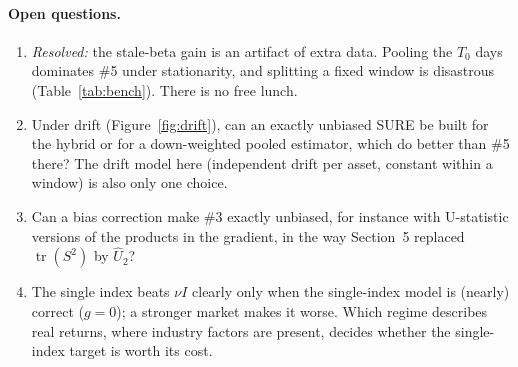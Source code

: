 \documentclass[11pt]{article}
\theoremstyle{remark}
\begin{document}
\paragraph{Open questions.}
\begin{enumerate}
  \item \emph{Resolved:} the stale-beta gain is an artifact of extra data. Pooling the $T_0$ days dominates \#5 under stationarity, and splitting a fixed window is disastrous (Table~\ref{tab:bench}). There is no free lunch.
  \item Under drift (Figure~\ref{fig:drift}), can an exactly unbiased SURE be built for the hybrid or for a down-weighted pooled estimator, which do better than \#5 there? The drift model here (independent drift per asset, constant within a window) is also only one choice.
  \item Can a bias correction make \#3 exactly unbiased, for instance with U-statistic versions of the products in the gradient, in the way Section~5 replaced $\operatorname{tr}(S^2)$ by $\hat U_2$?
  \item The single index beats $\nu I$ clearly only when the single-index model is (nearly) correct ($g = 0$); a stronger market makes it worse. Which regime describes real returns, where industry factors are present, decides whether the single-index target is worth its cost.
\end{enumerate}



\end{document}
